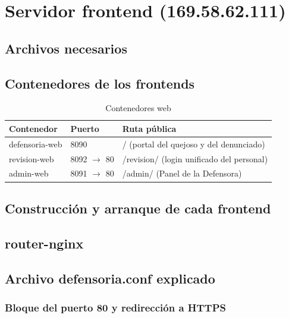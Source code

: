 \section{Servidor frontend (169.58.62.111)}

\subsection{Archivos necesarios}

\subsection{Contenedores de los frontends}
\begin{table}[H]
\centering
\caption{Contenedores web}
\begin{tabular}{lll}
\toprule
\textbf{Contenedor} & \textbf{Puerto} & \textbf{Ruta pública} \\
\midrule
defensoria-web & 8090 & / (portal del quejoso y del denunciado) \\
revision-web & 8092 $\rightarrow$ 80 & /revision/ (login unificado del personal) \\
admin-web & 8091 $\rightarrow$ 80 & /admin/ (Panel de la Defensora) \\
\bottomrule
\end{tabular}
\end{table}

\subsection{Construcción y arranque de cada frontend}

\subsection{router-nginx}

\subsection{Archivo defensoria.conf explicado}
\subsubsection{Bloque del puerto 80 y redirección a HTTPS}
